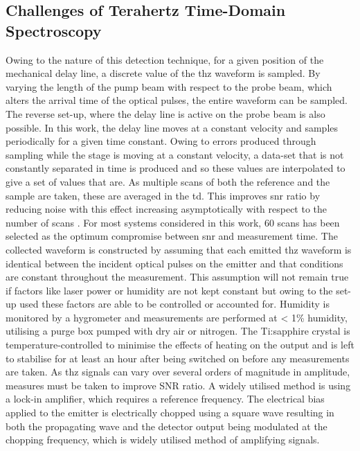 \subsection{Challenges of Terahertz Time-Domain Spectroscopy}
Owing to the nature of this detection technique, for a given position of the mechanical delay line, a discrete value of the \acrshort{thz} waveform is sampled. By varying the length of the pump beam with respect to the probe beam, which alters the arrival time of the optical pulses, the entire waveform can be sampled. The reverse set-up, where the delay line is active on the probe beam is also possible. In this work, the delay line moves at a constant velocity and samples periodically for a given time constant. Owing to errors produced through sampling while the stage is moving at a constant velocity,  a data\nobreakdash-set that is not constantly separated in time is produced and so these values are interpolated to give a set of values that are. As multiple scans of both the reference and the sample are taken, these are averaged in the \acrshort{td}. This improves \acrshort{snr} ratio by reducing noise with this effect increasing asymptotically with respect to the number of scans \cite{Popescu1996}. For most systems considered in this work, 60 scans has been selected as the optimum compromise between \acrshort{snr} and measurement time.
The collected waveform is constructed by assuming that each emitted \acrshort{thz} waveform is identical between the incident optical pulses on the emitter and that conditions are constant throughout the measurement. This assumption will not remain true if factors like laser power or humidity are not kept constant but owing to the set-up used these factors are able to be controlled or accounted for. Humidity is monitored by a hygrometer and measurements are performed at < 1\% humidity, utilising a purge box pumped with dry air or nitrogen. The Ti:sapphire crystal is temperature-controlled to minimise the effects of heating on the output and is left to stabilise for at least an hour after being switched on before any measurements are taken. 
As \acrshort{thz} signals can vary over several orders of magnitude in amplitude, measures must be taken to improve SNR ratio. A widely utilised method is using a lock-in amplifier, which requires a reference frequency. The electrical bias applied to the emitter is electrically chopped using a square wave resulting in both the propagating wave and the detector output being modulated at the chopping frequency, which is widely utilised method of amplifying signals.

